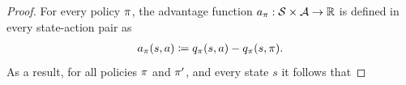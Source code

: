 \begin{proof}
For every policy $\pi$, the advantage function $a_\pi : \mathcal{S} \times \mathcal{A} \to \mathbb{R}$ is defined in every state-action pair as
\begin{align*}
    a_{\pi}(s,a) \coloneqq q_{\pi}(s,a) - q_{\pi}(s,\pi) .
\end{align*}
As a result, for all policies $\pi$ and $\pi'$, and every state $s$ it follows that

\end{proof}
